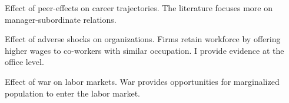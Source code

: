 \item Effect of peer-effects on career trajectories. The literature focuses more on manager-subordinate relations.\cite{Minni}\cite{Cullen}

\item Effect of adverse shocks on organizations. Firms retain workforce by offering higher wages to co-workers with similar occupation. I provide evidence at the office level.\cite{Jaeger}

\item Effect of war on labor markets. War provides opportunities for marginalized population to enter the labor market.\cite{Acemoglu}\cite{Golding}